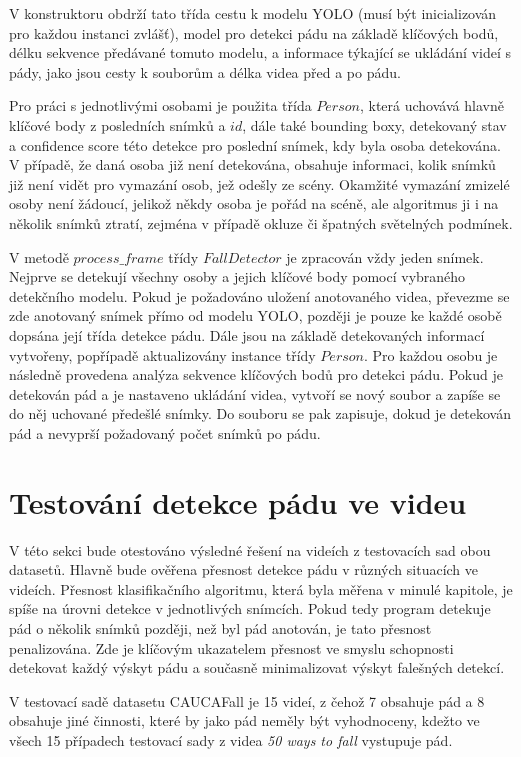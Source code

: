 V konstruktoru obdrží tato třída cestu k modelu YOLO (musí být inicializován
pro každou instanci zvlášť), model pro detekci pádu na základě klíčových bodů,
délku sekvence předávané tomuto modelu, a informace týkající se ukládání videí
s pády, jako jsou cesty k souborům a délka videa před a po pádu.

Pro práci s jednotlivými osobami je použita třída $Person$, která uchovává
hlavně klíčové body z posledních snímků a $id$, dále také bounding boxy,
detekovaný stav a confidence score této detekce pro poslední snímek, kdy byla
osoba detekována. V případě, že daná osoba již není detekována, obsahuje
informaci, kolik snímků již není vidět pro vymazání osob, jež odešly ze scény.
Okamžité vymazání zmizelé osoby není žádoucí, jelikož někdy osoba je pořád na
scéně, ale algoritmus ji i na několik snímků ztratí, zejména v případě okluze
či špatných světelných podmínek.

V metodě $process\_frame$ třídy $FallDetector$ je zpracován vždy jeden snímek.
Nejprve se detekují všechny osoby a jejich klíčové body pomocí vybraného
detekčního modelu. Pokud je požadováno uložení anotovaného videa, převezme se
zde anotovaný snímek přímo od modelu YOLO, později je pouze ke každé osobě
dopsána její třída detekce pádu. Dále jsou na základě detekovaných informací
vytvořeny, popřípadě aktualizovány instance třídy $Person$. Pro každou osobu je
následně provedena analýza sekvence klíčových bodů pro detekci pádu. Pokud je
detekován pád a je nastaveno ukládání videa, vytvoří se nový soubor a zapíše se
do něj uchované předešlé snímky. Do souboru se pak zapisuje, dokud je detekován
pád a nevyprší požadovaný počet snímků po pádu.

\section{Testování detekce pádu ve videu}
\label{sec:FallDetectionTest}

V této sekci bude otestováno výsledné řešení na videích z testovacích sad obou
datasetů. Hlavně bude ověřena přesnost detekce pádu v různých situacích ve
videích. Přesnost klasifikačního algoritmu, která byla měřena v minulé
kapitole, je spíše na úrovni detekce v jednotlivých snímcích. Pokud tedy
program detekuje pád o několik snímků později, než byl pád anotován, je tato
přesnost penalizována. Zde je klíčovým ukazatelem přesnost ve smyslu schopnosti
detekovat každý výskyt pádu a současně minimalizovat výskyt falešných detekcí.

V testovací sadě datasetu CAUCAFall je 15 videí, z čehož 7 obsahuje pád a 8
obsahuje jiné činnosti, které by jako pád neměly být vyhodnoceny, kdežto ve
všech 15 případech testovací sady z videa \textit{50 ways to fall} vystupuje
pád.

